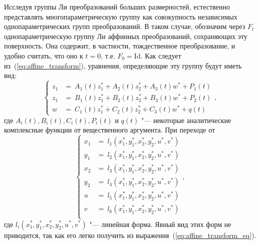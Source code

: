\documentclass[../main.tex]{subfiles}
\begin{document}
Исследуя группы Ли преобразований больших размерностей, естественно представлять многопараметрическую группу как совокупность независимых однопараметрических групп преобразований. В таком случае, обозначим через $F_t$ однопараметрическую группу Ли аффинных преобразований, сохраняющих эту поверхность. Она содержит, в частности, тождественное преобразование, и удобно считать, что оно  к $t = 0$, т.е. $F_0 = \textrm{Id}$. Как следует из~(\ref{eq:affine_transform}), уравнения, определяющие эту группу будут иметь вид:
\begin{equation}\label{eq:affine_transform_eq}
  \begin{cases}
     z_1 &=~A_{1}(t) z_1^* + A_{2}(t) z_2^* + A_{3}(t) w^* + P_1(t) \\
     z_1 &=~B_{1}(t) z_1^* + B_{2}(t) z_2^* + B_{3}(t) w^* + P_2(t) \\
     w   &=~C_{1}(t) z_1^* + C_{2}(t) z_2^* + C_{3}(t) w^* + q(t)
  \end{cases},
\end{equation}
где $A_{i}(t), B_{i}(t), C_{i}(t), P_i(t)$ и $q(t)$ "--- некоторые аналитические комплексные функции от вещественного аргумента. При переходе от 
\begin{equation}\label{eq:coordinates_transform}
  \begin{cases}
     x_1 &=~l_1(x_1^*, y_1^*, x_2^*, y_2^*, u^*, v^*)\\
     y_1 &=~l_2(x_1^*, y_1^*, x_2^*, y_2^*, u^*, v^*)\\
     x_2 &=~l_3(x_1^*, y_1^*, x_2^*, y_2^*, u^*, v^*)\\
     y_2 &=~l_4(x_1^*, y_1^*, x_2^*, y_2^*, u^*, v^*)\\
     u   &=~l_5(x_1^*, y_1^*, x_2^*, y_2^*, u^*, v^*)\\
     v   &=~l_6(x_1^*, y_1^*, x_2^*, y_2^*, u^*, v^*)\\
  \end{cases},
\end{equation}
где $l_i(x_1^*, y_1^*, x_2^*, y_2^*, u^*, v^*)$ "--- линейная форма. Явный вид этих форм не приводится, так как его легко получить из выражения~(\ref{eq:affine_transform_eq}).
\end{document}
